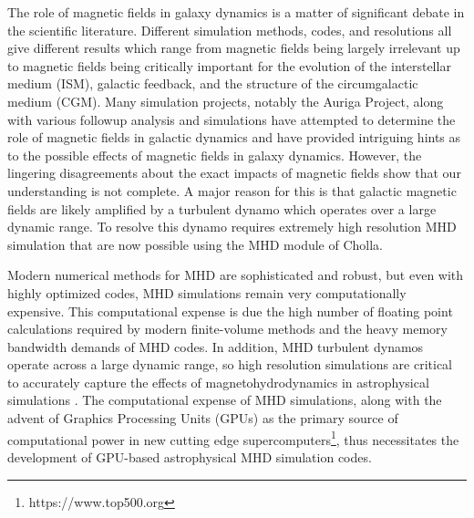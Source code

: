 The role of magnetic fields in galaxy dynamics is a matter of significant debate in the scientific literature. Different simulation methods, codes, and resolutions all give different results which range from magnetic fields being largely irrelevant up to magnetic fields being critically important for the evolution of the interstellar medium (ISM), galactic feedback, and the structure of the circumgalactic medium (CGM)\citep{pakmor_faraday_2018,pakmor_simulations_2013,pakmor_magnetic_2017,pakmor_magnetizing_2020,ntormousi_dynamo_2020,van_de_voort_effect_2021}. Many simulation projects, notably the Auriga Project\citep{grand_auriga_2017}, along with various followup analysis and simulations \citep{pakmor_faraday_2018,pakmor_simulations_2013,pakmor_magnetic_2017,pakmor_magnetizing_2020,ntormousi_dynamo_2020,van_de_voort_effect_2021} have attempted to determine the role of magnetic fields in galactic dynamics and have provided intriguing hints as to the possible effects of magnetic fields in galaxy dynamics. However, the lingering disagreements about the exact impacts of magnetic fields show that our understanding is not complete. A major reason for this is that galactic magnetic fields are likely amplified by a turbulent dynamo which operates over a large dynamic range\citep{beck_1996, carteret_2022, brandenburg_2022}. To resolve this dynamo requires extremely high resolution MHD simulation that are now possible using the MHD module of Cholla.

Modern numerical methods for MHD are sophisticated and robust, but even with highly optimized codes, MHD simulations remain very computationally expensive\cite{athena++_2020}. This computational expense is due the high number of floating point calculations required by modern finite-volume methods and the heavy memory bandwidth demands of MHD codes\citep{k_athena_2021}. In addition, MHD turbulent dynamos operate across a large dynamic range, so high resolution simulations are critical to accurately capture the effects of magnetohydrodynamics in astrophysical simulations \citep{galishnikova_tearing_2022, pakmor_simulations_2013}. The computational expense of MHD simulations, along with the advent of Graphics Processing Units (GPUs) as the primary source of computational power in new cutting edge supercomputers\footnote{https://www.top500.org}, thus necessitates the development of GPU-based astrophysical MHD simulation codes. 

